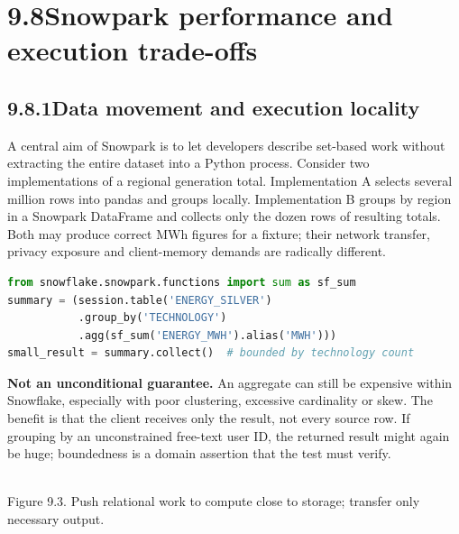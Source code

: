 \documentclass[11pt,twoside]{article}
\newcommand{\topic}[2]{\subsection*{#1\quad #2}}
\begin{document}
\section*{9.8\quad Snowpark performance and execution trade-offs}
\topic{9.8.1}{Data movement and execution locality}
A central aim of Snowpark is to let developers describe set-based work without extracting the entire dataset into a Python process. Consider two implementations of a regional generation total. Implementation A selects several million rows into pandas and groups locally. Implementation B groups by region in a Snowpark DataFrame and collects only the dozen rows of resulting totals. Both may produce correct MWh figures for a fixture; their network transfer, privacy exposure and client-memory demands are radically different.
\begin{lstlisting}[language=Python,caption={Prefer a bounded aggregate over collecting all facts.}]
from snowflake.snowpark.functions import sum as sf_sum
summary = (session.table('ENERGY_SILVER')
           .group_by('TECHNOLOGY')
           .agg(sf_sum('ENERGY_MWH').alias('MWH')))
small_result = summary.collect()  # bounded by technology count
\end{lstlisting}
\textbf{Not an unconditional guarantee.} An aggregate can still be expensive within Snowflake, especially with poor clustering, excessive cardinality or skew. The benefit is that the client receives only the result, not every source row. If grouping by an unconstrained free-text user ID, the returned result might again be huge; boundedness is a domain assertion that the test must verify.
\begin{center}\\{\fontsize{8}{9.5}\selectfont\color{inkgray}Figure 9.3. Push relational work to compute close to storage; transfer only necessary output.}\end{center}
\end{document}
